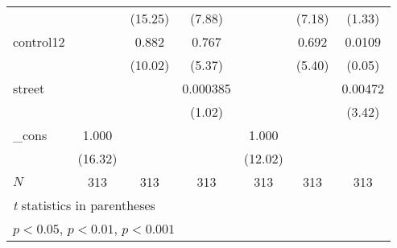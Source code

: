 {\begin{tabular}{l*{6}{c}}
            &                     &     (15.25)         &      (7.88)         &                     &      (7.18)         &      (1.33)         \\
[1em]
control12   &                     &       0.882\sym{***}&       0.767\sym{***}&                     &       0.692\sym{***}&      0.0109         \\
            &                     &     (10.02)         &      (5.37)         &                     &      (5.40)         &      (0.05)         \\
[1em]
street      &                     &                     &    0.000385         &                     &                     &     0.00472\sym{***}\\
            &                     &                     &      (1.02)         &                     &                     &      (3.42)         \\
[1em]
\_cons      &       1.000\sym{***}&                     &                     &       1.000\sym{***}&                     &                     \\
            &     (16.32)         &                     &                     &     (12.02)         &                     &                     \\
\hline
\(N\)       &         313         &         313         &         313         &         313         &         313         &         313         \\
\hline\hline
\multicolumn{7}{l}{\footnotesize \textit{t} statistics in parentheses}\\
\multicolumn{7}{l}{\footnotesize \sym{*} \(p<0.05\), \sym{**} \(p<0.01\), \sym{***} \(p<0.001\)}\\
\end{tabular}
}
